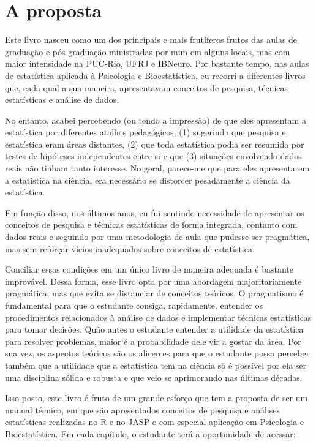 \documentclass[
]{book}
\begin{document}
\hypertarget{a-proposta}{%
\section{A proposta}\label{a-proposta}}

Este livro nasceu como um dos principais e mais frutíferos frutos das aulas de graduação e pós-graduação ministradas por mim em alguns locais, mas com maior intensidade na PUC-Rio, UFRJ e IBNeuro. Por bastante tempo, nas aulas de estatística aplicada à Psicologia e Bioestatística, eu recorri a diferentes livros que, cada qual a sua maneira, apresentavam conceitos de pesquisa, técnicas estatísticas e análise de dados.

No entanto, acabei percebendo (ou tendo a impressão) de que eles apresentam a estatística por diferentes atalhos pedagógicos, (1) sugerindo que pesquisa e estatística eram áreas distantes, (2) que toda estatística podia ser resumida por testes de hipóteses independentes entre si e que (3) situações envolvendo dados reais não tinham tanto interesse. No geral, parece-me que para eles apresentarem a estatística na ciência, era necessário se distorcer pesadamente a ciência da estatística.

Em função disso, nos últimos anos, eu fui sentindo necessidade de apresentar os conceitos de pesquisa e técnicas estatísticas de forma integrada, contanto com dados reais e seguindo por uma metodologia de aula que pudesse ser pragmática, mas sem reforçar vícios inadequados sobre conceitos de estatística.

Conciliar essas condições em um único livro de maneira adequada é bastante improvável. Dessa forma, esse livro opta por uma abordagem majoritariamente pragmática, mas que evita se distanciar de conceitos teóricos. O pragmatismo é fundamental para que o estudante consiga, rapidamente, entender os procedimentos relacionados à análise de dados e implementar técnicas estatísticas para tomar decisões. Quão antes o estudante entender a utilidade da estatística para resolver problemas, maior é a probabilidade dele vir a gostar da área. Por sua vez, os aspectos teóricos são os alicerces para que o estudante possa perceber também que a utilidade que a estatística tem na ciência só é possível por ela ser uma disciplina sólida e robusta e que veio se aprimorando nas últimas décadas.

Isso posto, este livro é fruto de um grande esforço que tem a proposta de ser um manual técnico, em que são apresentados conceitos de pesquisa e análises estatísticas realizadas no R e no JASP e com especial aplicação em Psicologia e Bioestatística. Em cada capítulo, o estudante terá a oportunidade de acessar:
\end{document}
